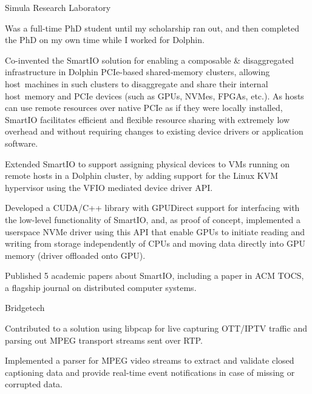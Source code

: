 \begin{experience}{Simula Research Laboratory}{
}
    \item{Was a full-time PhD student until my scholarship ran out, and then completed the PhD on my own time while I worked for Dolphin.}
    \item{Co-invented the SmartIO solution for enabling a composable \& disaggregated infrastructure in Dolphin PCIe-based shared-memory clusters, allowing host~machines in such clusters to disaggregate and share their internal host~memory and PCIe devices (such as GPUs, NVMes, FPGAs, etc.). %
        As hosts can use remote resources over native PCIe as if they were locally installed, SmartIO facilitates efficient and flexible resource sharing with extremely low overhead and without requiring changes to existing device drivers or application software.}
    \item{Extended SmartIO to support assigning physical devices to VMs running on remote hosts in a Dolphin cluster, by adding support for the Linux KVM hypervisor using the VFIO mediated device driver API.}
    \item{Developed a CUDA/C++ library with GPUDirect support for interfacing with the low-level functionality of SmartIO, and, as proof of concept, implemented a userspace NVMe driver using this API that enable GPUs to initiate reading and writing from storage independently of CPUs and moving data directly into GPU memory (driver offloaded onto GPU).}
    \item{Published 5 academic papers about SmartIO, including a paper in ACM TOCS, a flagship journal on distributed computer systems.}
\end{experience}

\begin{experience}{Bridgetech}{}
    \item{Contributed to a solution using libpcap for live capturing OTT/IPTV traffic and parsing out MPEG transport streams sent over RTP.}
    \item{Implemented a parser for MPEG video streams to extract and validate closed captioning data and provide real-time event notifications in case of missing or corrupted data.}
\end{experience}






